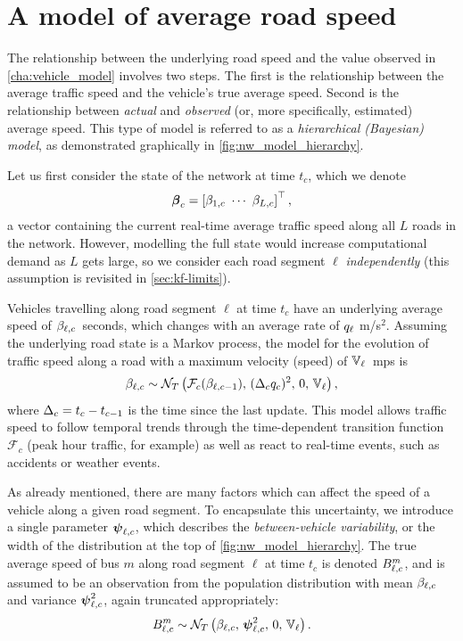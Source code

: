 \section{A model of average road speed}
\label{sec:nw_model}


The relationship between the underlying road speed and the value observed in \cref{cha:vehicle_model} involves two steps. The first is the relationship between the average traffic speed and the vehicle's true average speed. Second is the relationship between \emph{actual} and \emph{observed} (or, more specifically, estimated) average speed. This type of model is referred to as a \emph{hierarchical (Bayesian) model}, as demonstrated graphically in \cref{fig:nw_model_hierarchy}.


Let us first consider the state of the network at time $t_c$, which we denote
\begin{equation}\label{eq:nw_state}
\boldsymbol{\beta}_c =
\left[\beta_{1,c}\ \cdots\ \beta_{L,c}\right]^\top,
\end{equation}
a vector containing the current real-time average traffic speed along all $L$ roads in the network. However, modelling the full state would increase computational demand as $L$ gets large, so we consider each road segment $\ell$ \emph{independently} (this assumption is revisited in \cref{sec:kf-limits}).


Vehicles travelling along road segment $\ell$ at time $t_c$ have an underlying average speed of $\beta_{\ell,c}$~seconds, which changes with an average rate of $q_\ell$ m/s$^2$. Assuming the underlying road state is a Markov process, the model for the evolution of traffic speed along a road with a maximum velocity (speed) of $\mathbb{V}_\ell$~\gls{mps} is
\begin{equation}\label{eq:nw_state_markov}
\beta_{\ell,c} \sim
\mathcal{N}_T\left(\mathcal{F}_c(\beta_{\ell,c-1}),\, (\Delta_c q_c)^2,\, 0,\, \mathbb{V}_\ell\right),
\end{equation}
where $\Delta_c = t_c - t_{c-1}$ is the time since the last update. This model allows traffic speed to follow temporal trends through the time-dependent transition function $\mathcal{F}_c$ (peak hour traffic, for example) as well as react to real-time events, such as accidents or weather events.


As already mentioned, there are many factors which can affect the speed of a vehicle along a given road segment. To encapsulate this uncertainty, we introduce a single parameter $\mathbf{\boldsymbol{\psi}}_{\ell,c}$, which describes the \emph{between-vehicle variability}, or the width of the distribution at the top of \cref{fig:nw_model_hierarchy}. The true average speed of bus $m$ along road segment $\ell$ at time $t_c$ is denoted $B_{\ell,c}^m$, and is assumed to be an observation from the population distribution with mean $\beta_{\ell,c}$ and variance $\mathbf{\boldsymbol{\psi}}_{\ell,c}^2$, again truncated appropriately:
\begin{equation}\label{eq:nw_vehicle_tt}
B_{\ell,c}^m \sim
\mathcal{N}_T\left(\beta_{\ell,c},\, \mathbf{\boldsymbol{\psi}}_{\ell,c}^2,\, 0,\, \mathbb{V}_\ell\right).
\end{equation}



